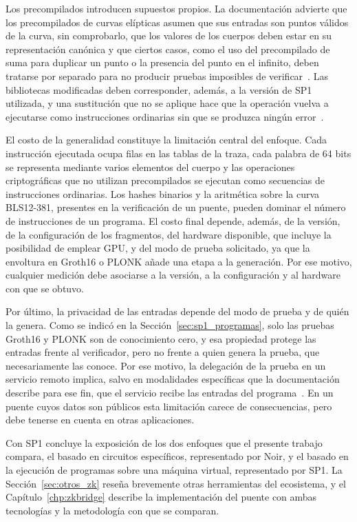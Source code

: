 Los precompilados introducen supuestos propios. La documentación advierte que los precompilados de
curvas elípticas asumen que sus entradas son puntos válidos de la curva, sin comprobarlo, que los
valores de los cuerpos deben estar en su representación canónica y que ciertos casos, como el uso
del precompilado de suma para duplicar un punto o la presencia del punto en el infinito, deben
tratarse por separado para no producir pruebas imposibles de verificar~\cite{sp1docsv6}. Las
bibliotecas modificadas deben corresponder, además, a la versión de SP1 utilizada, y una
sustitución que no se aplique hace que la operación vuelva a ejecutarse como instrucciones
ordinarias sin que se produzca ningún error~\cite{sp1docsv6}.

El costo de la generalidad constituye la limitación central del enfoque. Cada instrucción ejecutada
ocupa filas en las tablas de la traza, cada palabra de 64 bits se representa mediante varios
elementos del cuerpo y las operaciones criptográficas que no utilizan precompilados se ejecutan como
secuencias de instrucciones ordinarias. Los hashes binarios y la aritmética sobre la curva
BLS12-381, presentes en la verificación de un puente, pueden dominar el número de
instrucciones de un programa. El costo final depende, además, de la versión, de la configuración de
los fragmentos, del hardware disponible, que incluye la posibilidad de emplear GPU, y del modo de
prueba solicitado, ya que la envoltura en Groth16 o PLONK añade una etapa a la generación. Por ese
motivo, cualquier medición debe asociarse a la versión, a la configuración y al hardware con que se
obtuvo.

Por último, la privacidad de las entradas depende del modo de prueba y de quién la genera. Como se
indicó en la Sección~\ref{sec:sp1_programas}, solo las pruebas Groth16 y PLONK son de conocimiento
cero, y esa propiedad protege las entradas frente al verificador, pero no frente a quien genera la
prueba, que necesariamente las conoce. Por ese motivo, la delegación de la prueba en un servicio
remoto implica, salvo en modalidades específicas que la documentación describe para ese fin, que el
servicio recibe las entradas del programa~\cite{sp1docsv6}. En un puente cuyos datos son públicos esta limitación carece de
consecuencias, pero debe tenerse en cuenta en otras aplicaciones.

Con SP1 concluye la exposición de los dos enfoques que el presente trabajo compara, el basado en
circuitos específicos, representado por Noir, y el basado en la ejecución de programas sobre una
máquina virtual, representado por SP1. La Sección~\ref{sec:otros_zk} reseña brevemente otras
herramientas del ecosistema, y el Capítulo~\ref{chp:zkbridge} describe la implementación del puente
con ambas tecnologías y la metodología con que se comparan.
